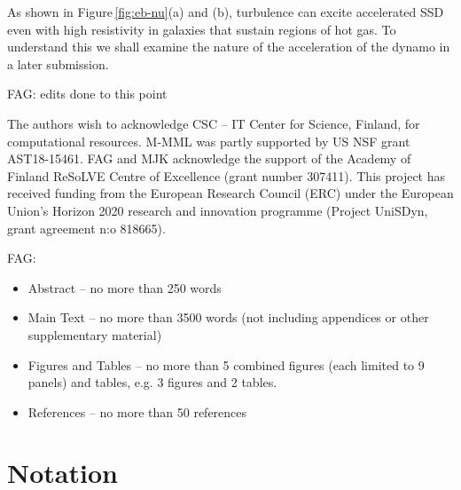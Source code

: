 \documentclass[preprint2]{aastex63}
\newcommand{\fag}[1]{\textcolor{midgreen}{FAG: #1}}
\begin{document}
As shown in Figure\,\ref{fig:eb-nu}(a) and (b), turbulence 
can excite accelerated SSD even with high resistivity in galaxies that
sustain regions of hot gas.
To understand this we shall examine the nature of the acceleration of the
dynamo in a later submission.



\fag{edits done to this point}


\acknowledgments
The authors wish to acknowledge CSC – IT Center for Science, Finland, for computational
resources.
 M-MML was partly supported by US NSF grant AST18-15461.
 FAG and MJK acknowledge the support of the Academy of Finland
ReSoLVE Centre of Excellence (grant number 307411).
This project has received funding from the European Research Council (ERC)
under the European Union's Horizon 2020 research and innovation
programme (Project UniSDyn, grant agreement n:o 818665).

{}


\appendix
\fag{
\begin{itemize}
\item
    Abstract – no more than 250 words
\item
    Main Text – no more than 3500 words (not including appendices or other supplementary material)
\item
    Figures and Tables – no more than 5 combined figures (each limited to 9 panels) and tables, e.g. 3 figures and 2 tables.
\item
    References – no more than 50 references
\end{itemize}}

\section{Notation}\label{sec:table}
\end{document}
